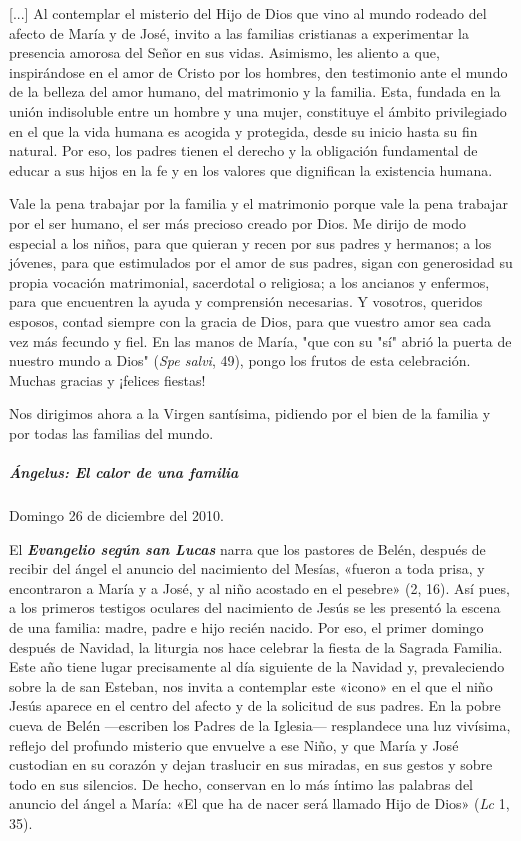 \documentclass[]{article}
\let\oldsubparagraph\subparagraph
\renewcommand{\subparagraph}[1]{\oldsubparagraph{#1}\mbox{}}
\begin{document}
{[}...{]} Al contemplar el misterio del Hijo de Dios que vino al mundo
rodeado del afecto de María y de José, invito a las familias cristianas
a experimentar la presencia amorosa del Señor en sus vidas. Asimismo,
les aliento a que, inspirándose en el amor de Cristo por los hombres,
den testimonio ante el mundo de la belleza del amor humano, del
matrimonio y la familia. Esta, fundada en la unión indisoluble entre un
hombre y una mujer, constituye el ámbito privilegiado en el que la vida
humana es acogida y protegida, desde su inicio hasta su fin natural. Por
eso, los padres tienen el derecho y la obligación fundamental de educar
a sus hijos en la fe y en los valores que dignifican la existencia
humana.

Vale la pena trabajar por la familia y el matrimonio porque vale la pena
trabajar por el ser humano, el ser más precioso creado por Dios. Me
dirijo de modo especial a los niños, para que quieran y recen por sus
padres y hermanos; a los jóvenes, para que estimulados por el amor de
sus padres, sigan con generosidad su propia vocación matrimonial,
sacerdotal o religiosa; a los ancianos y enfermos, para que encuentren
la ayuda y comprensión necesarias. Y vosotros, queridos esposos, contad
siempre con la gracia de Dios, para que vuestro amor sea cada vez más
fecundo y fiel. En las manos de María, "que con su "sí" abrió la puerta
de nuestro mundo a Dios" (\emph{Spe salvi}, 49), pongo los frutos de
esta celebración. Muchas gracias y ¡felices fiestas!

Nos dirigimos ahora a la Virgen santísima, pidiendo por el bien de la
familia y por todas las familias del mundo.

\subparagraph{Ángelus: El calor de una
familia}\label{uxe1ngelus-el-calor-de-una-familia}

Domingo 26 de diciembre del 2010.

El \emph{\textbf{Evangelio según san Lucas}} narra que los pastores de
Belén, después de recibir del ángel el anuncio del nacimiento del
Mesías, «fueron a toda prisa, y encontraron a María y a José, y al niño
acostado en el pesebre» (2, 16). Así pues, a los primeros testigos
oculares del nacimiento de Jesús se les presentó la escena de una
familia: madre, padre e hijo recién nacido. Por eso, el primer domingo
después de Navidad, la liturgia nos hace celebrar la fiesta de la
Sagrada Familia. Este año tiene lugar precisamente al día siguiente de
la Navidad y, prevaleciendo sobre la de san Esteban, nos invita a
contemplar este «icono» en el que el niño Jesús aparece en el centro del
afecto y de la solicitud de sus padres. En la pobre cueva de Belén
---escriben los Padres de la Iglesia--- resplandece una luz vivísima,
reflejo del profundo misterio que envuelve a ese Niño, y que María y
José custodian en su corazón y dejan traslucir en sus miradas, en sus
gestos y sobre todo en sus silencios. De hecho, conservan en lo más
íntimo las palabras del anuncio del ángel a María: «El que ha de nacer
será llamado Hijo de Dios» (\emph{Lc} 1, 35).
\end{document}
